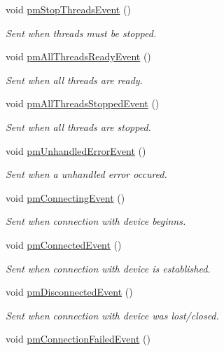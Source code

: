 \begin{DoxyCompactItemize}
void \hyperlink{classmdt_port_manager_a7b81ee6491167fa17574d840720d9b33}{pm\-Stop\-Threads\-Event} ()
\begin{DoxyCompactList}\small\item\em Sent when threads must be stopped. \end{DoxyCompactList}\item 
void \hyperlink{classmdt_port_manager_a6dd5529e6de23897fe5082ee4a33fa3d}{pm\-All\-Threads\-Ready\-Event} ()
\begin{DoxyCompactList}\small\item\em Sent when all threads are ready. \end{DoxyCompactList}\item 
void \hyperlink{classmdt_port_manager_a1bfd4d20867ecae2cad1b95b52860b12}{pm\-All\-Threads\-Stopped\-Event} ()
\begin{DoxyCompactList}\small\item\em Sent when all threads are stopped. \end{DoxyCompactList}\item 
void \hyperlink{classmdt_port_manager_a94d3fa4a26f8686449313a54003f0b4d}{pm\-Unhandled\-Error\-Event} ()
\begin{DoxyCompactList}\small\item\em Sent when a unhandled error occured. \end{DoxyCompactList}\item 
void \hyperlink{classmdt_port_manager_a04fb1d09af226677cacd6f0e485d9810}{pm\-Connecting\-Event} ()
\begin{DoxyCompactList}\small\item\em Sent when connection with device beginns. \end{DoxyCompactList}\item 
void \hyperlink{classmdt_port_manager_a871ec7f9676a12c84196404285cf2161}{pm\-Connected\-Event} ()
\begin{DoxyCompactList}\small\item\em Sent when connection with device is established. \end{DoxyCompactList}\item 
void \hyperlink{classmdt_port_manager_ab4667ac04a31166eeb7b5f92893b16db}{pm\-Disconnected\-Event} ()
\begin{DoxyCompactList}\small\item\em Sent when connection with device was lost/closed. \end{DoxyCompactList}\item 
void \hyperlink{classmdt_port_manager_a57fc083d7db52279ec6b990b75705552}{pm\-Connection\-Failed\-Event} ()

\end{DoxyCompactItemize}
